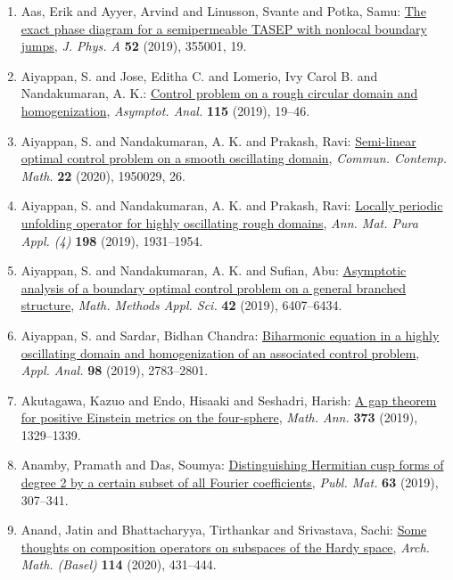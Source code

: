 \begin{enumerate}
\item Aas, Erik and Ayyer, Arvind and Linusson, Svante and Potka,
Samu: \href{https://doi.org/10.1088/1751-8121/ab2e96}{The exact phase diagram for a semipermeable {TASEP} with
nonlocal boundary jumps}, \emph{J. Phys. A} {\bf 52} (2019), 355001, 19.
\item Aiyappan, S. and Jose, Editha C. and Lomerio, Ivy Carol B. and
Nandakumaran, A. K.: \href{https://doi.org/10.3233/asy-191526}{Control problem on a rough circular domain and homogenization}, \emph{Asymptot. Anal.} {\bf 115} (2019), 19--46.
\item Aiyappan, S. and Nandakumaran, A. K. and Prakash, Ravi: \href{https://doi.org/10.1142/S0219199719500299}{Semi-linear optimal control problem on a smooth oscillating
domain}, \emph{Commun. Contemp. Math.} {\bf 22} (2020), 1950029, 26.
\item Aiyappan, S. and Nandakumaran, A. K. and Prakash, Ravi: \href{https://doi.org/10.1007/s10231-019-00848-7}{Locally periodic unfolding operator for highly oscillating
rough domains}, \emph{Ann. Mat. Pura Appl. (4)} {\bf 198} (2019), 1931--1954.
\item Aiyappan, S. and Nandakumaran, A. K. and Sufian, Abu: \href{https://doi.org/10.1002/mma.5748}{Asymptotic analysis of a boundary optimal control problem on a
general branched structure}, \emph{Math. Methods Appl. Sci.} {\bf 42} (2019), 6407--6434.
\item Aiyappan, S. and Sardar, Bidhan Chandra: \href{https://doi.org/10.1080/00036811.2018.1471207}{Biharmonic equation in a highly oscillating domain and
homogenization of an associated control problem}, \emph{Appl. Anal.} {\bf 98} (2019), 2783--2801.
\item Akutagawa, Kazuo and Endo, Hisaaki and Seshadri, Harish: \href{https://doi.org/10.1007/s00208-018-1749-x}{A gap theorem for positive {E}instein metrics on the
four-sphere}, \emph{Math. Ann.} {\bf 373} (2019), 1329--1339.
\item Anamby, Pramath and Das, Soumya: \href{https://doi.org/10.5565/PUBLMAT6311911}{Distinguishing {H}ermitian cusp forms of degree 2 by a certain
subset of all {F}ourier coefficients}, \emph{Publ. Mat.} {\bf 63} (2019), 307--341.
\item Anand, Jatin and Bhattacharyya, Tirthankar and Srivastava,
Sachi: \href{https://doi.org/10.1007/s00013-019-01406-6}{Some thoughts on composition operators on subspaces of the
{H}ardy space}, \emph{Arch. Math. (Basel)} {\bf 114} (2020), 431--444.

\end{enumerate}
